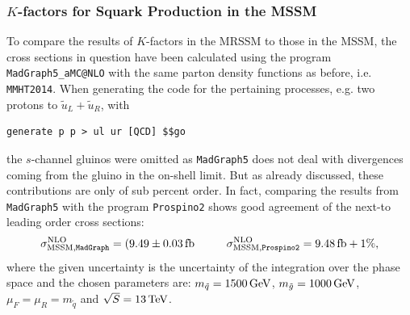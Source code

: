 \subsubsection{$K$-factors for Squark Production in the MSSM}
To compare the results of $K$-factors in the MRSSM to those in the MSSM, the cross sections in question have been calculated using the program \texttt{MadGraph5\_aMC@NLO}\cite{Alwall:2014hca} with the same parton density functions as before, i.e. \texttt{MMHT2014}\cite{Harland-Lang:2014zoa}. When generating the code for the pertaining processes, e.g. two protons to $\tilde{u}_L + \tilde{u}_R$, with
\begin{lstlisting}[style=Mybash]
generate p p > ul ur [QCD] $$go
\end{lstlisting}
the $s$-channel gluinos were omitted as \texttt{MadGraph5} does not deal with divergences coming from the gluino in the on-shell limit. But as already discussed, these contributions are only of sub percent order. In fact, comparing the results from \texttt{MadGraph5} with the program \texttt{Prospino2} shows good agreement of the next-to leading order cross sections:
\begin{align}
\sigma^{\mathrm{NLO}}_{\mathrm{MSSM,\texttt{MadGraph}}} = \unit[(9.49 \pm 0.03]{fb} \hspace{1cm}  \sigma^{\mathrm{NLO}}_{\mathrm{MSSM,\texttt{Prospino2}}} = \unit[9.48]{fb} + 1\%,
\end{align}
where the given uncertainty is the uncertainty of the integration over the phase space and the chosen parameters are: $m_{\tilde{q}} =\unit[1500]{GeV}$, $m_{\tilde{g}} = \unit[1000]{GeV}$, $\mu_F = \mu_R = m_{\tilde{q}}$ and $\sqrt{S} = \unit[13]{TeV}$.
